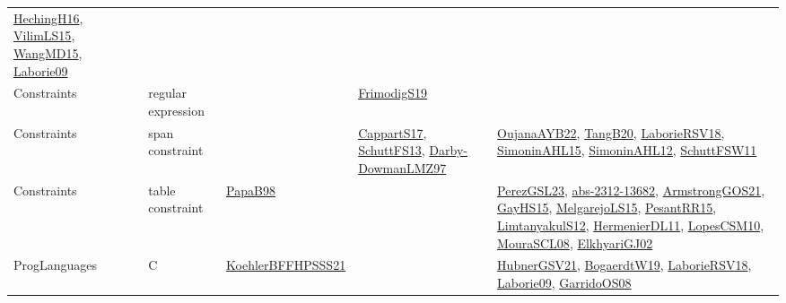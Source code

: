 {\begin{longtable}{lp{3cm}>{\raggedright}p{6cm}>{\raggedright}p{6cm}p{8cm}}
\href{papers/HechingH16.pdf}{HechingH16}\cite{HechingH16}, \href{papers/VilimLS15.pdf}{VilimLS15}\cite{VilimLS15}, \href{articles/WangMD15.pdf}{WangMD15}\cite{WangMD15}, \href{papers/Laborie09.pdf}{Laborie09}\cite{Laborie09}\\
Constraints & regular expression &  & \href{papers/FrimodigS19.pdf}{FrimodigS19}\cite{FrimodigS19} & \\
Constraints & span constraint &  & \href{papers/CappartS17.pdf}{CappartS17}\cite{CappartS17}, \href{papers/SchuttFS13.pdf}{SchuttFS13}\cite{SchuttFS13}, \href{articles/Darby-DowmanLMZ97.pdf}{Darby-DowmanLMZ97}\cite{Darby-DowmanLMZ97} & \href{papers/OujanaAYB22.pdf}{OujanaAYB22}\cite{OujanaAYB22}, \href{papers/TangB20.pdf}{TangB20}\cite{TangB20}, \href{articles/LaborieRSV18.pdf}{LaborieRSV18}\cite{LaborieRSV18}, \href{articles/SimoninAHL15.pdf}{SimoninAHL15}\cite{SimoninAHL15}, \href{papers/SimoninAHL12.pdf}{SimoninAHL12}\cite{SimoninAHL12}, \href{articles/SchuttFSW11.pdf}{SchuttFSW11}\cite{SchuttFSW11}\\
Constraints & table constraint & \href{articles/PapaB98.pdf}{PapaB98}\cite{PapaB98} &  & \href{papers/PerezGSL23.pdf}{PerezGSL23}\cite{PerezGSL23}, \href{articles/abs-2312-13682.pdf}{abs-2312-13682}\cite{abs-2312-13682}, \href{papers/ArmstrongGOS21.pdf}{ArmstrongGOS21}\cite{ArmstrongGOS21}, \href{papers/GayHS15.pdf}{GayHS15}\cite{GayHS15}, \href{papers/MelgarejoLS15.pdf}{MelgarejoLS15}\cite{MelgarejoLS15}, \href{papers/PesantRR15.pdf}{PesantRR15}\cite{PesantRR15}, \href{articles/LimtanyakulS12.pdf}{LimtanyakulS12}\cite{LimtanyakulS12}, \href{papers/HermenierDL11.pdf}{HermenierDL11}\cite{HermenierDL11}, \href{articles/LopesCSM10.pdf}{LopesCSM10}\cite{LopesCSM10}, \href{papers/MouraSCL08.pdf}{MouraSCL08}\cite{MouraSCL08}, \href{papers/ElkhyariGJ02.pdf}{ElkhyariGJ02}\cite{ElkhyariGJ02}\\
ProgLanguages & C  & \href{articles/KoehlerBFFHPSSS21.pdf}{KoehlerBFFHPSSS21}\cite{KoehlerBFFHPSSS21} &  & \href{articles/HubnerGSV21.pdf}{HubnerGSV21}\cite{HubnerGSV21}, \href{papers/BogaerdtW19.pdf}{BogaerdtW19}\cite{BogaerdtW19}, \href{articles/LaborieRSV18.pdf}{LaborieRSV18}\cite{LaborieRSV18}, \href{papers/Laborie09.pdf}{Laborie09}\cite{Laborie09}, \href{articles/GarridoOS08.pdf}{GarridoOS08}\cite{GarridoOS08}\\

\end{longtable}}
